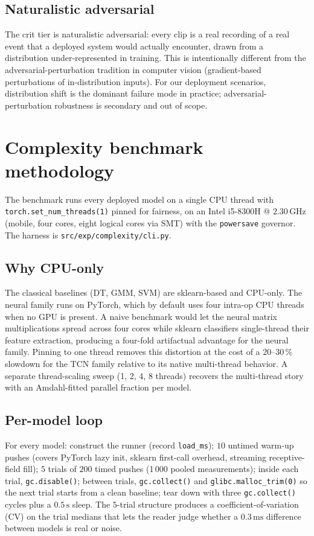 \subsection*{Naturalistic adversarial}

The crit tier is naturalistic adversarial: every clip is a real recording of a real event that a deployed system would actually encounter, drawn from a distribution under-represented in training.
This is intentionally different from the adversarial-perturbation tradition in computer vision (gradient-based perturbations of in-distribution inputs).
For our deployment scenarios, distribution shift is the dominant failure mode in practice; adversarial-perturbation robustness is secondary and out of scope.

\section{Complexity benchmark methodology}
\label{sec:eval_complexity}

The benchmark runs every deployed model on a single CPU thread with \texttt{torch.set\_num\_threads(1)} pinned for fairness, on an Intel i5-8300H @ $2.30\,\text{GHz}$ (mobile, four cores, eight logical cores via SMT) with the \texttt{powersave} governor.
The harness is \texttt{src/exp/complexity/cli.py}.

\subsection*{Why CPU-only}

The classical baselines (DT, GMM, SVM) are sklearn-based and CPU-only.
The neural family runs on PyTorch, which by default uses four intra-op CPU threads when no GPU is present.
A naive benchmark would let the neural matrix multiplications spread across four cores while sklearn classifiers single-thread their feature extraction, producing a four-fold artifactual advantage for the neural family.
Pinning to one thread removes this distortion at the cost of a $20$--$30\,\%$ slowdown for the TCN family relative to its native multi-thread behavior.
A separate thread-scaling sweep (1, 2, 4, 8 threads) recovers the multi-thread story with an Amdahl-fitted parallel fraction per model.

\subsection*{Per-model loop}

For every model: construct the runner (record \texttt{load\_ms}); $10$ untimed warm-up pushes (covers PyTorch lazy init, sklearn first-call overhead, streaming receptive-field fill); $5$ trials of $200$ timed pushes (1\,000 pooled measurements); inside each trial, \texttt{gc.disable()}; between trials, \texttt{gc.collect()} and \texttt{glibc.malloc\_trim(0)} so the next trial starts from a clean baseline; tear down with three \texttt{gc.collect()} cycles plus a $0.5\,\text{s}$ sleep.
The $5$-trial structure produces a coefficient-of-variation (CV) on the trial medians that lets the reader judge whether a $0.3\,\text{ms}$ difference between models is real or noise.

